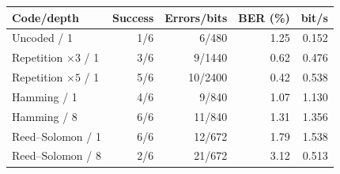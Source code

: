 \begin{tabular}{@{}lrrrr@{}}\toprule
Code/depth & Success & Errors/bits & BER (\%) & bit/s\\\midrule
Uncoded / 1 & 1/6 & 6/480 & 1.25 & 0.152\\
Repetition $\times3$ / 1 & 3/6 & 9/1440 & 0.62 & 0.476\\
Repetition $\times5$ / 1 & 5/6 & 10/2400 & 0.42 & 0.538\\
Hamming / 1 & 4/6 & 9/840 & 1.07 & 1.130\\
Hamming / 8 & 6/6 & 11/840 & 1.31 & 1.356\\
Reed--Solomon / 1 & 6/6 & 12/672 & 1.79 & 1.538\\
Reed--Solomon / 8 & 2/6 & 21/672 & 3.12 & 0.513\\
\bottomrule\end{tabular}
